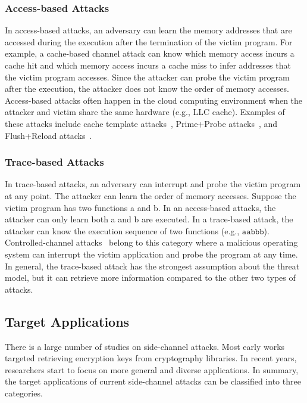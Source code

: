 \subsubsection*{Access-based Attacks}
In access-based attacks, an adversary can learn the memory addresses that are accessed during the execution after the termination of the victim program. 
For example, a cache-based channel attack can know which memory access incurs a cache hit and which memory access incurs a cache miss to infer addresses that the victim program accesses. Since the attacker can probe the victim program after the execution, the attacker does not know the order of memory accesses. Access-based attacks often happen in the cloud computing environment when the attacker and victim share the same hardware (e.g., LLC cache). Examples of these attacks include cache template attacks~\cite{191010}, Prime+Probe attacks~\cite{liu2015last}, and Flush+Reload attacks~\cite{yarom2014flush+}.
\subsubsection*{Trace-based Attacks}
In trace-based attacks, an adversary can interrupt and  probe the victim program at any point. The attacker can learn the order of memory accesses. Suppose the victim program has two functions \textsf{a} and \textsf{b}. In an access-based attacks, the attacker can only learn both \textsf{a} and \textsf{b} are executed. In a trace-based attack, the attacker can know the execution sequence of two functions (e.g., $\mathtt{aabbb}$). Controlled-channel attacks~\cite{moghimi2020copycat, xu2015controlled} belong to this category where a malicious operating system can interrupt the victim application and probe the program at any time. In general, the trace-based attack has the strongest assumption about the threat model,  but it can retrieve more information compared to the other two types of attacks.
\subsection{Target Applications}
There is a large number of studies\cite{yarom2017cachebleed,191010,184415,Osvik2006,liu2015last} on side-channel attacks. Most early works targeted retrieving encryption keys from cryptography libraries. In recent years, researchers start to focus on more general and diverse applications. In summary,  the target applications of current side-channel attacks can be classified into three categories.

